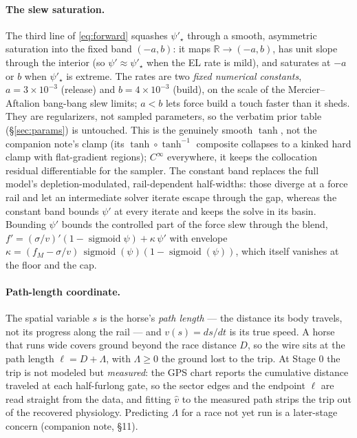 \documentclass[11pt]{article}
\DeclareMathOperator{\sigmoid}{sigmoid}
\begin{document}
\paragraph{The slew saturation.} The third line of \eqref{eq:forward} squashes $\psi'_\star$ through a smooth, asymmetric saturation into the fixed band $(-a, b)$: it maps $\mathbb{R} \to (-a, b)$, has unit slope through the interior (so $\psi' \approx \psi'_\star$ when the EL rate is mild), and saturates at $-a$ or $b$ when $\psi'_\star$ is extreme. The rates are two \emph{fixed numerical constants}, $a = 3 \times 10^{-3}$ (release) and $b = 4 \times 10^{-3}$ (build), on the scale of the Mercier--Aftalion bang-bang slew limits; $a < b$ lets force build a touch faster than it sheds. They are regularizers, not sampled parameters, so the verbatim prior table (\S\ref{sec:params}) is untouched. This is the genuinely smooth $\tanh$, not the companion note's clamp (its $\tanh \circ \tanh^{-1}$ composite collapses to a kinked hard clamp with flat-gradient regions); $C^\infty$ everywhere, it keeps the collocation residual differentiable for the sampler. The constant band replaces the full model's depletion-modulated, rail-dependent half-widths: those diverge at a force rail and let an intermediate solver iterate escape through the gap, whereas the constant band bounds $\psi'$ at every iterate and keeps the solve in its basin. Bounding $\psi'$ bounds the controlled part of the force slew through the blend, $f' = (\sigma/v)'(1 - \sigmoid\psi) + \kappa\,\psi'$ with envelope $\kappa = (f_M - \sigma/v)\,\sigmoid(\psi)(1 - \sigmoid(\psi))$, which itself vanishes at the floor and the cap.

\paragraph{Path-length coordinate.} The spatial variable $s$ is the horse's \emph{path length} --- the distance its body travels, not its progress along the rail --- and $v(s) = ds/dt$ is its true speed. A horse that runs wide covers ground beyond the race distance $D$, so the wire sits at the path length $\ell = D + \Lambda$, with $\Lambda \geq 0$ the ground lost to the trip. At Stage 0 the trip is not modeled but \emph{measured}: the GPS chart reports the cumulative distance traveled at each half-furlong gate, so the sector edges and the endpoint $\ell$ are read straight from the data, and fitting $\hat v$ to the measured path strips the trip out of the recovered physiology. Predicting $\Lambda$ for a race not yet run is a later-stage concern (companion note, \S11).
\end{document}
